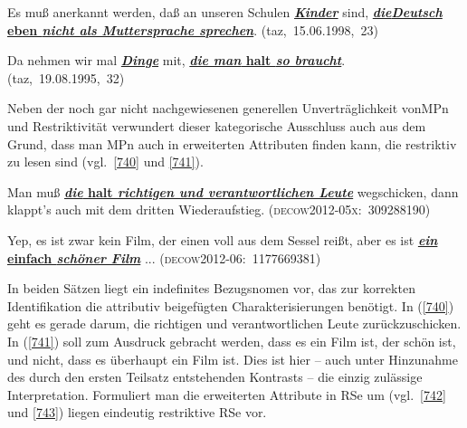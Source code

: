 \begin{exe}
	\ex\label{738} 
	Es muß anerkannt werden, daß an unseren Schulen \ul{\textit{\textbf{Kinder}}} sind, \ul{\textit{\textbf{die}}}\linebreak \ul{\textbf{\textit{Deutsch} eben \textit{nicht als Muttersprache sprechen}}}. 		
	\hfill\hbox{(taz, 15.06.1998, 23)}
\end{exe}	

\begin{exe}
	\ex\label{739} 
	Da nehmen wir mal \ul{\textit{\textbf{Dinge}}} mit, \ul{\textbf{\textit{die man} halt \textit{so braucht}}}.
	\newline
	\hbox{}\hfill\hbox{(taz, 19.08.1995, 32)}
	\newline
	\hbox{}\hfill\hbox{\citet[68]{Kwon2005}}	
\end{exe}					
Neben der noch gar nicht nachgewiesenen generellen Unverträglichkeit von\linebreak MPn und Restriktivität verwundert dieser kategorische Ausschluss auch aus dem Grund, dass man MPn auch in erweiterten Attributen finden kann, die restriktiv zu lesen sind (vgl.\ \ref{740} und \ref{741}).

\begin{exe}
	\ex\label{740} 
	Man muß \ul{\textbf{\textit{die} halt \textit{richtigen und verantwortlichen Leute}}} wegschicken, dann klappt's auch mit dem dritten Wiederaufstieg.		
	\newline
	\hbox{}\hfill\hbox{\scshape(decow2012-05x: 309288190)}
\end{exe}

\begin{exe}
	\ex\label{741} 
	Yep, es ist zwar kein Film, der einen voll aus dem Sessel reißt, aber es ist \ul{\textbf{\textit{ein} einfach \textit{schöner Film}}} ...
	\hfill\hbox{\scshape(decow2012-06: 1177669381)}
\end{exe}	              
In beiden Sätzen liegt ein indefinites Bezugsnomen vor, das zur korrekten Identifikation die attributiv beigefügten Charakterisierungen benötigt. In (\ref{740}) geht es gerade darum, die richtigen und verantwortlichen Leute zurückzuschicken. In (\ref{741}) soll zum Ausdruck gebracht werden, dass es ein Film ist, der schön ist, und nicht, dass es überhaupt ein Film ist. Dies ist hier – auch unter Hinzunahme des durch den ersten Teilsatz entstehenden Kontrasts – die einzig zulässige Interpretation. Formuliert man die erweiterten Attribute in RSe um (vgl.\ \ref{742} und \ref{743}) liegen eindeutig restriktive RSe vor.

